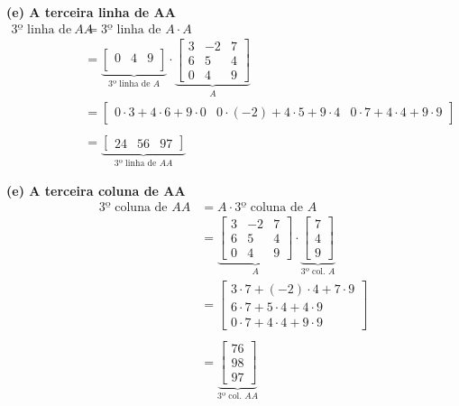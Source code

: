 \documentclass[a4paper,12pt]{article}
\begin{document}
\textbf{(e) A terceira linha de AA}
\begin{align*}
    \text{3º linha de }AA &= \text{3º linha de }A \cdot A \\
    &=
    \underbrace{
    \begin{bmatrix}
        0 & 4 & 9 \\
    \end{bmatrix}}_{\text{3º linha de }A}
    \cdot
    \underbrace{
    \begin{bmatrix}
        3 & -2 & 7 \\
        6 & 5 & 4 \\
        0 & 4 & 9
    \end{bmatrix}}_{A} \\
    &=
    \begin{bmatrix}
        0 \cdot 3    + 4 \cdot 6 + 9 \cdot 0 &
        0 \cdot (-2) + 4 \cdot 5 + 9 \cdot 4 &
        0 \cdot 7    + 4 \cdot 4 + 9 \cdot 9
    \end{bmatrix} \\ \\
    &=
    \underbrace{
    \begin{bmatrix}
        24 & 56 & 97
    \end{bmatrix}}_{\text{3º linha de }AA}
\end{align*}

\textbf{(e) A terceira coluna de AA}
\begin{align*}
    \text{3º coluna de }AA &= A \cdot \text{3º coluna de }A \\
    &=
    \underbrace{
    \begin{bmatrix}
        3 & -2 & 7 \\
        6 & 5 & 4 \\
        0 & 4 & 9
    \end{bmatrix}}_{A}
    \cdot
    \underbrace{
    \begin{bmatrix}
        7 \\
        4 \\
        9
    \end{bmatrix}}_{\text{3º col. }A} \\
    &=
    \begin{bmatrix}
        3 \cdot 7 + (-2) \cdot 4 + 7 \cdot 9 \\
        6 \cdot 7 +   5  \cdot 4 + 4 \cdot 9 \\
        0 \cdot 7 +   4  \cdot 4 + 9 \cdot 9
    \end{bmatrix} \\ \\
    &=
    \underbrace{
    \begin{bmatrix}
        76 \\
        98 \\
        97
    \end{bmatrix}}_{\text{3º col. }AA}
\end{align*}
\end{document}
